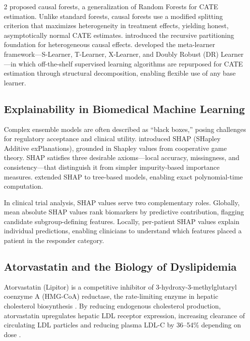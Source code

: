 \documentclass[12pt]{article}
\begin{document}
\begin{multicols}{2}
\citet{wager2018estimation} proposed causal forests, a generalization of
Random Forests for CATE estimation.  Unlike standard forests, causal forests
use a modified splitting criterion that maximizes heterogeneity in treatment
effects, yielding honest, asymptotically normal CATE estimates.
\citet{athey2016recursive} introduced the recursive partitioning foundation
for heterogeneous causal effects.  \citet{kunzel2019metalearners} developed
the meta-learner framework---S-Learner, T-Learner, X-Learner, and Doubly
Robust (DR) Learner---in which off-the-shelf supervised learning algorithms
are repurposed for CATE estimation through structural decomposition, enabling
flexible use of any base learner.

\subsection{Explainability in Biomedical Machine Learning}

Complex ensemble models are often described as ``black boxes,'' posing
challenges for regulatory acceptance and clinical utility.
\citet{lundberg2017unified} introduced SHAP (SHapley Additive exPlanations),
grounded in Shapley values from cooperative game theory.  SHAP satisfies
three desirable axioms---local accuracy, missingness, and consistency---that
distinguish it from simpler impurity-based importance measures.
\citet{lundberg2020local} extended SHAP to tree-based models, enabling exact
polynomial-time computation.

In clinical trial analysis, SHAP values serve two complementary roles.
Globally, mean absolute SHAP values rank biomarkers by predictive
contribution, flagging candidate subgroup-defining features.  Locally,
per-patient SHAP values explain individual predictions, enabling clinicians
to understand which features placed a patient in the responder category.

\subsection{Atorvastatin and the Biology of Dyslipidemia}

Atorvastatin (Lipitor) is a competitive inhibitor of
3-hydroxy-3-methylglutaryl coenzyme A (HMG-CoA) reductase, the rate-limiting
enzyme in hepatic cholesterol biosynthesis \citep{lennernas2003clinical}.  By
reducing endogenous cholesterol production, atorvastatin upregulates hepatic
LDL receptor expression, increasing clearance of circulating LDL particles
and reducing plasma LDL-C by 36--54\% depending on dose \citep{grundy2019aha}.


\end{multicols}
\end{document}
